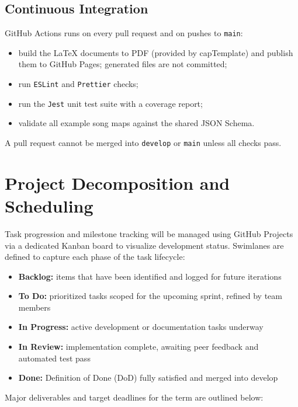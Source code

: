 \documentclass{article}
\begin{document}
\subsection{Continuous Integration}
GitHub Actions runs on every pull request and on pushes to \texttt{main}:
\begin{itemize}
    \item build the \LaTeX{} documents to PDF (provided by capTemplate) and
    publish them to GitHub Pages; generated files are not committed;
    \item run \texttt{ESLint} and \texttt{Prettier} checks;
    \item run the \texttt{Jest} unit test suite with a coverage report;
    \item validate all example song maps against the shared JSON Schema.
\end{itemize}
A pull request cannot be merged into \texttt{develop} or \texttt{main} unless
all checks pass.

\section{Project Decomposition and Scheduling}

Task progression and milestone tracking will be managed using GitHub Projects via a dedicated Kanban board to visualize development status. Swimlanes are defined to capture each phase of the task lifecycle:

\begin{itemize}
    \item \textbf{Backlog:} items that have been identified and logged for future iterations
    \item \textbf{To Do:} prioritized tasks scoped for the upcoming sprint, refined by team members
    \item \textbf{In Progress:} active development or documentation tasks underway
    \item \textbf{In Review:} implementation complete, awaiting peer feedback and automated test pass
    \item \textbf{Done:} Definition of Done (DoD) fully satisfied and merged into develop
\end{itemize}

Major deliverables and target deadlines for the term are outlined below:
\end{document}
